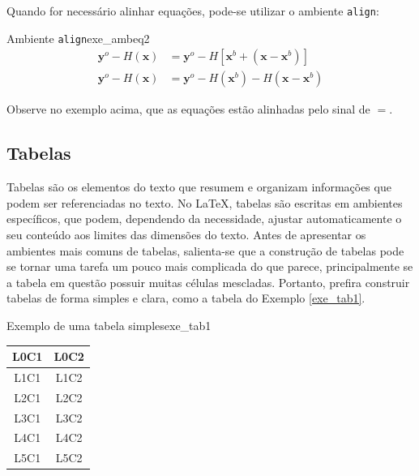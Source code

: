 Quando for necessário alinhar equações, pode-se utilizar o ambiente \texttt{align}:


\begin{texexptitled}[breakable,center lower,enhanced,middle=2mm]{Ambiente \texttt{align}}{exe_ambeq2}
\begin{align*}
\mathbf{y}^{o} - \textit{H}(\mathbf{x}) & = \mathbf{y}^{o} - \textit{H}[\mathbf{x}^{b} + (\mathbf{x} - \mathbf{x}^{b})] \\
\label{apI_eq:4}
\mathbf{y}^{o} - \textit{H}(\mathbf{x}) & = \mathbf{y}^{o} - \textit{H}(\mathbf{x}^{b}) - \textit{H}(\mathbf{x} - \mathbf{x}^{b})
\end{align*}
\end{texexptitled}

Observe no exemplo acima, que as equações estão alinhadas pelo sinal de \texttt{$=$}.

\subsection{Tabelas}
\label{sec:tabs}

Tabelas são os elementos do texto que resumem e organizam informações que podem ser referenciadas no texto. No \LaTeX{}, tabelas são escritas em ambientes específicos, que podem, dependendo da necessidade, ajustar automaticamente o seu conteúdo aos limites das dimensões do texto. Antes de apresentar os ambientes mais comuns de tabelas, salienta-se que a construção de tabelas pode se tornar uma tarefa um pouco mais complicada do que parece, principalmente se a tabela em questão possuir muitas células mescladas. Portanto, prefira construir tabelas de forma simples e clara, como a tabela do Exemplo \ref{exe_tab1}.

\begin{texexptitled}[breakable,center lower,enhanced,middle=2mm]{Exemplo de uma tabela simples}{exe_tab1}
\begin{tabular}{c c}
\hline 
\textbf{L0C1} & \textbf{L0C2} \\
\hline
L1C1 & L1C2 \\
L2C1 & L2C2 \\
L3C1 & L3C2 \\
L4C1 & L4C2 \\
L5C1 & L5C2 \\
\hline
\end{tabular}
\end{texexptitled}

